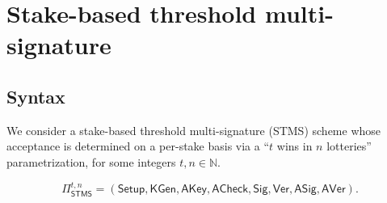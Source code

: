 \documentclass{article}
\begin{document}
\section{Stake-based threshold multi-signature}


\subsection{Syntax}

We consider a stake-based threshold multi-signature (STMS) scheme whose acceptance is determined on a per-stake basis via a ``$t$ wins in $n$ lotteries'' parametrization, for some integers $t,n \in \mathbb{N}$.



\[
  \Pi_{\mathsf{STMS}}^{t,n}
  =
  (\mathsf{Setup}, \mathsf{KGen}, \mathsf{AKey}, \mathsf{ACheck},
   \mathsf{Sig}, \mathsf{Ver}, \mathsf{ASig}, \mathsf{AVer}) .
\]
\end{document}
